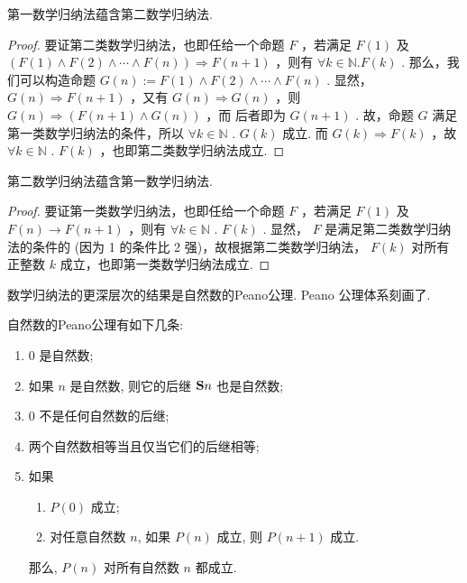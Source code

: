   \begin{lemma}
    第一数学归纳法蕴含第二数学归纳法. 
  \end{lemma} 
  \begin{proof}
    要证第二类数学归纳法，也即任给一个命题  $F$  ，若满足  $F(1)$  及  $(F(1) \wedge F(2) \wedge \cdots \wedge F(n)) \Rightarrow F(n+1)$  ，则有  $\forall k \in \mathbb{N} . F(k)$  . 
    那么，我们可以构造命题  $G(n):=F(1) \wedge F(2) \wedge \cdots \wedge F(n)$  . 
    显然，  $G(n) \Rightarrow F(n+1)$  ，又有  $G(n) \Rightarrow G(n)$  ，则  $G(n) \Rightarrow(F(n+1) \wedge G(n))$  ，而 后者即为  $G(n+1)$  . 
    故，命题  $G$  满足第一类数学归纳法的条件，所以  $\forall k \in \mathbb{N}$ . $G(k)$  成立. 
    而  $G(k) \Rightarrow F(k)$  ，故  $\forall k \in \mathbb{N}$ . $F(k)$  ，也即第二类数学归纳法成立. 
  \end{proof}
  \begin{lemma}
    第二数学归纳法蕴含第一数学归纳法. 
  \end{lemma} 
  \begin{proof}
    要证第一类数学归纳法，也即任给一个命题  $F$  ，若满足  $F(1)$  及  $F(n) \rightarrow F(n+1)$  ，则有  $\forall k \in \mathbb{N}$ . $F(k)$  . 
    显然，  $F$  是满足第二类数学归纳法的条件的 (因为 1 的条件比 2 强)，故根据第二类数学归纳法，  $F(k)$  对所有正整数  $k$  成立，也即第一类数学归纳法成立. 
  \end{proof}

数学归纳法的更深层次的结果是自然数的Peano公理. Peano 公理体系刻画了. 

\begin{definition}
    自然数的Peano公理有如下几条: 
    \begin{enumerate}
      \item 0 是自然数;
      \item 如果 $n$ 是自然数, 则它的后继 ${\bf S}n$ 也是自然数;
      \item 0 不是任何自然数的后继;
      \item 两个自然数相等当且仅当它们的后继相等;
      \item {} 如果
        \begin{enumerate}
          \item $P(0)$ 成立;
          \item 对任意自然数 $n$, 如果 $P(n)$ 成立, 则 $P(n+1)$ 成立. 
        \end{enumerate}
        那么, $P(n)$ 对所有自然数 $n$ 都成立. 
    \end{enumerate}
\end{definition}

